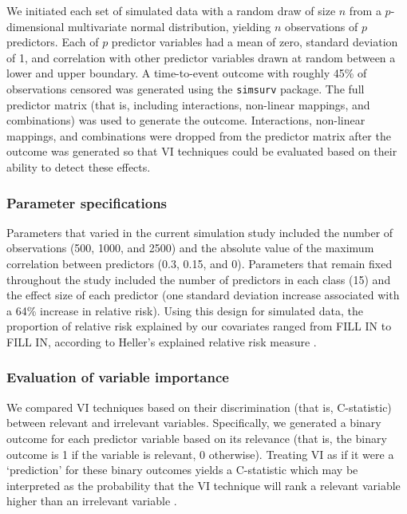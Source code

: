 \documentclass{article}\usepackage[]{graphicx}\usepackage[]{xcolor}
\newcommand{\ie}{that is}
\begin{document}
We initiated each set of simulated data with a random draw of size $n$ from a $p$-dimensional multivariate normal distribution, yielding $n$ observations of $p$ predictors. Each of $p$ predictor variables had a mean of zero, standard deviation of 1, and correlation with other predictor variables drawn at random between a lower and upper boundary. A time-to-event outcome with roughly 45\% of observations censored was generated using the \texttt{simsurv} package. The full predictor matrix (\ie, including interactions, non-linear mappings, and combinations) was used to generate the outcome. Interactions, non-linear mappings, and combinations were dropped from the predictor matrix after the outcome was generated so that VI techniques could be evaluated based on their ability to detect these effects.

\subsubsection{Parameter specifications}




Parameters that varied in the current simulation study included the number of observations (500, 1000, and 2500) and the absolute value of the maximum correlation between predictors (0.3, 0.15, and 0). Parameters that remain fixed throughout the study included the number of predictors in each class (15) and the effect size of each predictor (one standard deviation increase associated with a 64\% increase in relative risk). Using this design for simulated data, the proportion of relative risk explained by our covariates ranged from FILL IN to FILL IN, according to Heller's explained relative risk measure \citep{heller2012measure}.

\subsubsection{Evaluation of variable importance}

We compared VI techniques based on their discrimination (\ie, C-statistic) between relevant and irrelevant variables. Specifically, we generated a binary outcome for each predictor variable based on its relevance (\ie, the binary outcome is 1 if the variable is relevant, 0 otherwise). Treating VI as if it were a ‘prediction’ for these binary outcomes yields a C-statistic which may be interpreted as the probability that the VI technique will rank a relevant variable higher than an irrelevant variable \citep{harrell1982evaluating}.
\end{document}
